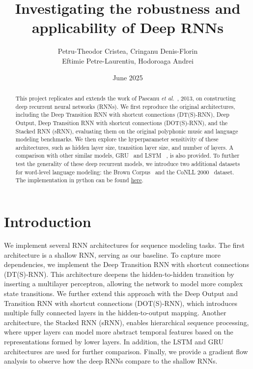 \documentclass{article}
\title{Investigating the robustness and applicability of Deep RNNs}
\author{
 Petru-Theodor Cristea, Cringanu Denis-Florin\\
  Eftimie Petre-Laurentiu, Hodoroaga Andrei
}
\date{June 2025}
\begin{document}
\maketitle

\begin{abstract}
This project replicates and extends the work of Pascanu \textit{et al.}~\cite{pascanu2013construct}, 2013, on constructing deep recurrent neural networks (RNNs). We first reproduce the original architectures, including the Deep Transition RNN with shortcut connections (DT(S)-RNN), Deep Output, Deep Transition RNN with shortcut connections (DOT(S)-RNN), and the Stacked RNN (sRNN), evaluating them on the original polyphonic music and language modeling benchmarks. We then explore the hyperparameter sensitivity of these architectures, such as hidden layer size, transition layer size, and number of layers. A comparison with other similar models, GRU~\cite{cho2014learning} and LSTM ~\cite{hochreiter1997long}, is also provided. To further test the generality of these deep recurrent models, we introduce two additional datasets for word-level language modeling: the Brown Corpus~\cite{francis1979brown} and the CoNLL 2000~\cite{tjong-kim-sang-buchholz-2000-introduction} dataset. The implementation in python can be found \href{https://github.com/lowLevelGod/DeepRNNs}{here}.
\end{abstract}

\section{Introduction}

We implement several RNN architectures for sequence modeling tasks. The first architecture is a shallow RNN, serving as our baseline. To capture more dependencies, we implement the Deep Transition RNN with shortcut connections (DT(S)-RNN). This architecture deepens the hidden-to-hidden transition by inserting a multilayer perceptron, allowing the network to model more complex state transitions. We further extend this approach with the Deep Output and Transition RNN with shortcut connections (DOT(S)-RNN), which introduces multiple fully connected layers in the hidden-to-output mapping. Another architecture, the Stacked RNN (sRNN), enables hierarchical sequence processing, where upper layers can model more abstract temporal features based on the representations formed by lower layers. In addition, the LSTM and GRU architectures are used for further comparison. Finally, we provide a gradient flow analysis to observe how the deep RNNs compare to the shallow RNNs.
\end{document}
